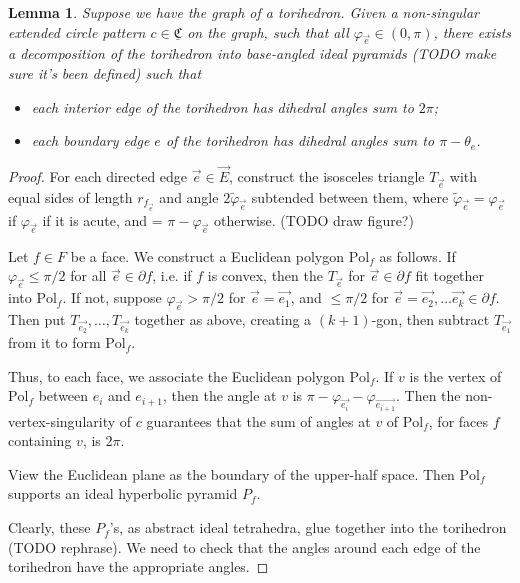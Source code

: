 \documentclass[11pt]{amsart}
\newcommand{\CCC}{{\underline{\mathfrak{C}}}}
\newcommand{\del}{\partial}
\newcommand{\vphi}{\varphi}
\newcommand{\Pol}{{\text{Pol}}}
\theoremstyle{plain}
\newtheorem{lemma}[theorem]{Lemma}
\theoremstyle{definition}
\begin{document}
\begin{lemma}
\label{l:circpattern_polyhedra}
Suppose we have the graph of a torihedron.
Given a non-singular extended circle pattern $c \in \CCC$ on the graph,
such that all $\vphi_{\vec{e}} \in (0,\pi)$,
there exists a decomposition of the torihedron
into base-angled ideal pyramids (TODO make sure it's been defined) such that
	\begin{itemize}
		\item each interior edge of the torihedron has dihedral angles sum to $2\pi$;
		\item each boundary edge $e$ of the torihedron has dihedral angles sum to
			$\pi - \theta_e$.
	\end{itemize}
\end{lemma}

\begin{proof}
For each directed edge $\vec{e} \in \vec{E}$,
construct the isosceles triangle $T_{\vec{e}}$
with equal sides of length $r_{f_{\vec{e}}}$ and
angle $2\tilde{\vphi}_{\vec{e}}$ subtended between them,
where $\tilde{\vphi}_{\vec{e}} = \vphi_{\vec{e}}$
if $\vphi_{\vec{e}}$ if it is acute,
and = $\pi - \vphi_{\vec{e}}$ otherwise.
(TODO draw figure?)


Let $f \in F$ be a face.
We construct a Euclidean polygon $\Pol_f$ as follows.
If $\vphi_{\vec{e}} \leq \pi/2$ for all $\vec{e} \in \del f$,
i.e. if $f$ is convex, then 
the $T_{\vec{e}}$ for $\vec{e}\in \del f$
fit together into $\Pol_f$.
If not, suppose $\vphi_{\vec{e}} > \pi/2$
for $\vec{e} = \vec{e_1}$, 
and $\leq \pi/2$ for $\vec{e} = \vec{e_2},\ldots \vec{e_k} \in \del f$.
Then put $T_{\vec{e_2}},\ldots,T_{\vec{e_k}}$ together as above,
creating a $(k+1)$-gon,
then subtract $T_{\vec{e_1}}$ from it to form $\Pol_f$.

Thus, to each face, we associate the Euclidean polygon $\Pol_f$.
If $v$ is the vertex of $\Pol_f$ between $e_i$ and $e_{i+1}$,
then the angle at $v$ is
$\pi - \vphi_{\vec{e_i}} - \vphi_{\vec{e_{i+1}}}$.
Then the non-vertex-singularity of $c$ guarantees that
the sum of angles at $v$ of $\Pol_f$, for faces $f$ containing $v$,
is $2\pi$.


View the Euclidean plane as the boundary of the upper-half space.
Then $\Pol_f$ supports an ideal hyperbolic pyramid $P_f$.

Clearly, these $P_f$'s, as abstract ideal tetrahedra,
glue together into the torihedron (TODO rephrase).
We need to check that the angles around each edge of
the torihedron have the appropriate angles.



\end{proof}
\end{document}
